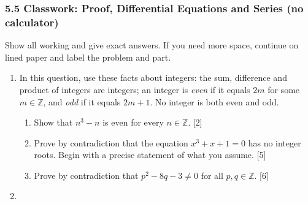 \documentclass[12pt, twoside]{article}
\begin{document}
\subsubsection*{5.5 Classwork: Proof, Differential Equations and Series (no calculator)}

Show all working and give exact answers. If you need more space, continue
on lined paper and label the problem and part.

\begin{enumerate}[itemsep=0.15cm]

\item[1.] [Maximum mark: 13]

In this question, use these facts about integers: the sum, difference and
product of integers are integers; an integer is \emph{even} if it equals
$2m$ for some $m \in \mathbb{Z}$, and \emph{odd} if it equals $2m + 1$.
No integer is both even and odd.

\begin{enumerate}[itemsep=0.1cm]
  \item Show that $n^{3} - n$ is even for every $n \in \mathbb{Z}$. \hfill [2]
  \item Prove by contradiction that the equation $x^{3} + x + 1 = 0$ has
  no integer roots. Begin with a precise statement of what you assume.
  \hfill [5]
  \item Prove by contradiction that $p^{2} - 8q - 3 \neq 0$ for all
  $p, q \in \mathbb{Z}$. \hfill [6]
\end{enumerate}


\newpage

\item[2.] [Maximum mark: 17]


\end{enumerate}
\end{document}
